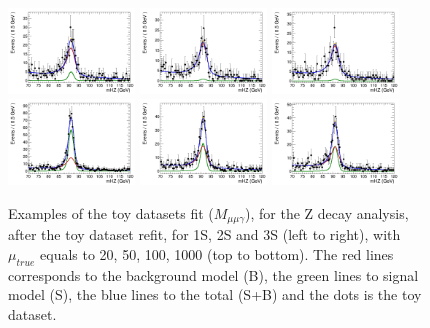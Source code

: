 \begin{figure}[!htbp]
\begin{center}
\includegraphics[width=0.3\textwidth]{figures/modeling_xchecks/plots/ZToUpsilon1SPhoton_Cat0_signalStrenght_100/Cat0_mHZ_fit_s}
\includegraphics[width=0.3\textwidth]{figures/modeling_xchecks/plots/ZToUpsilon2SPhoton_Cat0_signalStrenght_100/Cat0_mHZ_fit_s}
\includegraphics[width=0.3\textwidth]{figures/modeling_xchecks/plots/ZToUpsilon3SPhoton_Cat0_signalStrenght_100/Cat0_mHZ_fit_s}
\includegraphics[width=0.3\textwidth]{figures/modeling_xchecks/plots/ZToUpsilon1SPhoton_Cat0_signalStrenght_1000/Cat0_mHZ_fit_s}
\includegraphics[width=0.3\textwidth]{figures/modeling_xchecks/plots/ZToUpsilon2SPhoton_Cat0_signalStrenght_1000/Cat0_mHZ_fit_s}
\includegraphics[width=0.3\textwidth]{figures/modeling_xchecks/plots/ZToUpsilon3SPhoton_Cat0_signalStrenght_1000/Cat0_mHZ_fit_s}
\end{center}
\caption{Examples of the toy datasets fit ($M_{\mu\mu\gamma}$), for the Z decay analysis, after the toy dataset refit, for 1S, 2S and 3S (left to right), with $\mu_{true}$ equals to 20, 50, 100, 1000 (top to bottom). The red lines corresponds to the background model (B), the green lines to signal model (S), the blue lines to the total (S+B) and the dots is the toy dataset.}
\label{fig:fits_xchecks_mHZ_Z}
\end{figure}



